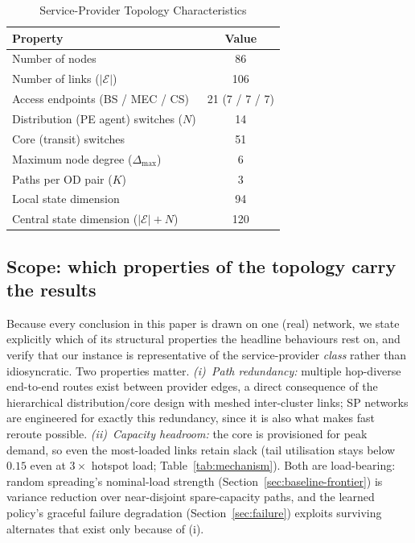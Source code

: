 \documentclass[10pt,journal,comsoc]{IEEEtran}
\begin{document}
\begin{table}[!t]
  \centering
  \caption{Service-Provider Topology Characteristics}
  \label{tab:topology}
  \begin{tabular}{lc}
    \toprule
    \textbf{Property} & \textbf{Value} \\
    \midrule
    Number of nodes & 86 \\
    Number of links ($|\mathcal{E}|$) & 106 \\
    Access endpoints (BS / MEC / CS) & 21 (7 / 7 / 7) \\
    Distribution (PE agent) switches ($N$) & 14 \\
    Core (transit) switches & 51 \\
    Maximum node degree ($\Delta_{\max}$) & 6 \\
    Paths per OD pair ($K$) & 3 \\
    \midrule
    Local state dimension & 94 \\
    Central state dimension ($|\mathcal{E}|+N$) & 120 \\
    \bottomrule
  \end{tabular}
\end{table}

\subsection{Scope: which properties of the topology carry the results}
\label{subsec:topology-scope}
Because every conclusion in this paper is drawn on one (real) network, we state explicitly which of its structural properties the headline behaviours rest on, and verify that our instance is representative of the service-provider \emph{class} rather than idiosyncratic. Two properties matter. \emph{(i)~Path redundancy:} multiple hop-diverse end-to-end routes exist between provider edges, a direct consequence of the hierarchical distribution/core design with meshed inter-cluster links; SP networks are engineered for exactly this redundancy, since it is also what makes fast reroute possible. \emph{(ii)~Capacity headroom:} the core is provisioned for peak demand, so even the most-loaded links retain slack (tail utilisation stays below $0.15$ even at $3\times$ hotspot load; Table~\ref{tab:mechanism}). Both are load-bearing: random spreading's nominal-load strength (Section~\ref{sec:baseline-frontier}) is variance reduction over near-disjoint spare-capacity paths, and the learned policy's graceful failure degradation (Section~\ref{sec:failure}) exploits surviving alternates that exist only because of (i).
\end{document}
